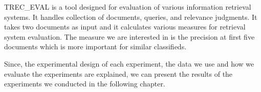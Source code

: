 TREC\_EVAL is a tool designed for evaluation of various information retrieval systems. It handles collection of documents, queries, and relevance judgments. It takes two documents as input and it calculates various measures for retrieval system evaluation. The measure we are interested in is the precision at first five documents which is more important for similar classifieds.



Since, the experimental design of each experiment, the data we use and how we evaluate the experiments are explained, we can present the results of the experiments we conducted in the following chapter.